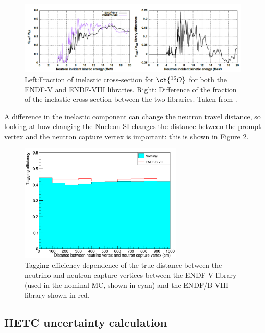 \begin{figure}[!htb]
    \centering
    \includegraphics[width=\textwidth]{Figures/neutron_cross_section_endf_O.PNG}
\caption{Left:Fraction of inelastic cross-section for $\ch{^{16}O}$ for both the ENDF-V and ENDF-VIII libraries. Right: Difference of the fraction of the inelastic cross-section between the two libraries. Taken from \cite{tn415_fiacob}.}
\label{fig:neutron_cross_section_O}
\end{figure}

A difference in the inelastic component can change the neutron travel distance, so looking at how changing the Nucleon SI changes the distance between the prompt vertex and the neutron capture vertex is important: this is shown in Figure \ref{fig:ENDF8_syst_error}.

\begin{figure}[!htb]
\centering
    \includegraphics[width=0.7\textwidth]{Figures/endf8_tageff_plot.PNG}
\caption{Tagging efficiency dependence of the true distance between the neutrino and neutron capture vertices between the ENDF V library (used in the nominal MC, shown in cyan) and the ENDF/B VIII library shown in red.}
\label{fig:ENDF8_syst_error}
\end{figure}

\subsection{HETC uncertainty calculation}

